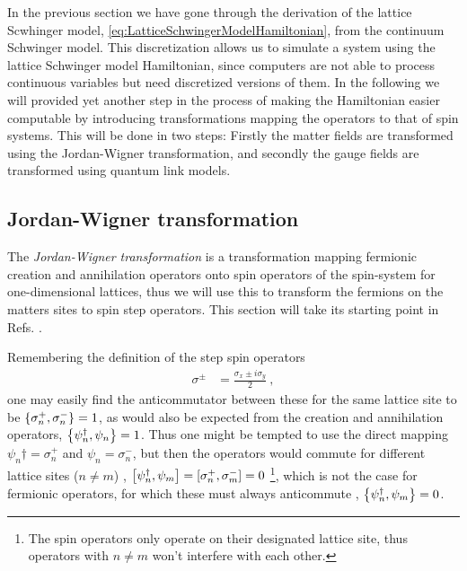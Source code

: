 \documentclass[../main.tex]{subfiles} %
\begin{document}
In the previous section we have gone through the derivation of the lattice Scwhinger model, \cref{eq:LatticeSchwingerModelHamiltonian}, from the continuum Schwinger model. This discretization allows us to simulate a system using the lattice Schwinger model Hamiltonian, since computers are not able to process continuous variables but need discretized versions of them. In the following we will provided yet another step in the process of making the Hamiltonian easier computable by introducing transformations mapping the operators to that of spin systems. This will be done in two steps: Firstly the matter fields are transformed using the Jordan-Wigner transformation, and secondly the gauge fields are transformed using quantum link models.



\subsection{Jordan-Wigner transformation}

The \emph{Jordan-Wigner transformation} is a transformation mapping fermionic creation and annihilation operators onto spin operators of the spin-\half system for one-dimensional lattices, thus we will use this to transform the fermions on the matters sites to spin step operators. This section will take its starting point in Refs. \cite{jordan-wigner_1928, banksSusskindKogut_StrongCopling_1976, panyella_masterThesis_2019}.

Remembering the definition of the step spin operators \cite{sakurai_modernQM_2017}
\begin{align}
    \sigma^\pm &= \frac{\sigma_x \pm i \sigma_y}{2} \: ,
\end{align}
one may easily find the anticommutator between these for the same lattice site to be $\anticommutator{\sigma_n^+}{\sigma_n^-} = 1$, as would also be expected from the creation and annihilation operators, $\anticommutator{\psi_n\dagger}{\psi_n} = 1$. Thus one might be tempted to use the direct mapping $\psi_n\dagger = \sigma_n^+$ and $\psi_n = \sigma_n^-$, but then the operators would commute for different lattice sites ($n \ne m$) \cite{susskind_latticeFermions_1977}, $\commutator{\psi_n\dagger}{\psi_m} = \commutator{\sigma_n^+}{\sigma_m^-} = 0$ \footnote{The spin operators only operate on their designated lattice site, thus operators with $n \ne m$ won't interfere with each other.}, which is not the case for fermionic operators, for which these must always anticommute \cite{sakurai_modernQM_2017}, $\anticommutator{\psi_n\dagger}{\psi_m} = 0$.
\end{document}
